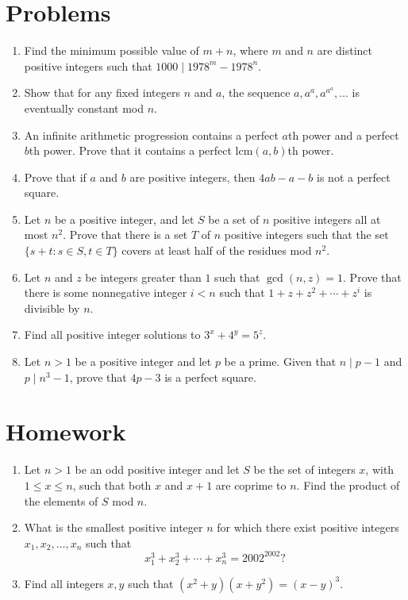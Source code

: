 \documentclass{article}
\newcommand\lcm{\mathrm{lcm}}
\begin{document}
\section{Problems}
\begin{enumerate}
  \item Find the minimum possible value of $m+n$, where $m$ and $n$ are distinct
    positive integers such that $1000\mid 1978^m-1978^n$.
  \item Show that for any fixed integers $n$ and $a$, the sequence
    $a,a^a,a^{a^a},\ldots$ is eventually constant mod $n$.
  \item An infinite arithmetic progression contains a perfect $a$th power and a
    perfect $b$th power. Prove that it contains a perfect $\lcm(a,b)$th power.
  \item Prove that if $a$ and $b$ are positive integers, then $4ab-a-b$ is not a
    perfect square.
  \item Let $n$ be a positive integer, and let $S$ be a set of $n$ positive
    integers all at most $n^2$. Prove that there is a set $T$ of $n$ positive
    integers such that the set $\{s+t:s\in S,t\in T\}$ covers at least half of
    the residues mod $n^2$.
  \item Let $n$ and $z$ be integers greater than $1$ such that $\gcd(n,z)=1$.
    Prove that there is some nonnegative integer $i<n$ such that
    $1+z+z^2+\cdots+z^i$ is divisible by $n$.
  \item Find all positive integer solutions to $3^x+4^y=5^z$.
  \item Let $n>1$ be a positive integer and let $p$ be a prime. Given that
    $n\mid p-1$ and $p\mid n^3-1$, prove that $4p-3$ is a perfect square.
\end{enumerate}
\newpage
\section{Homework}
\begin{enumerate}
  \item Let $n>1$ be an odd positive integer and let $S$ be the set of integers
    $x$, with $1\le x\le n$, such that both $x$ and $x+1$ are coprime to $n$.
    Find the product of the elements of $S$ mod $n$.
  \item What is the smallest positive integer $n$ for which there exist positive
    integers $x_1,x_2,\ldots,x_n$ such that
    \[x_1^3+x_2^3+\cdots+x_n^3=2002^{2002}?\]
  \item Find all integers $x,y$ such that $(x^2+y)(x+y^2)=(x-y)^3$.
\end{enumerate}
\end{document}

